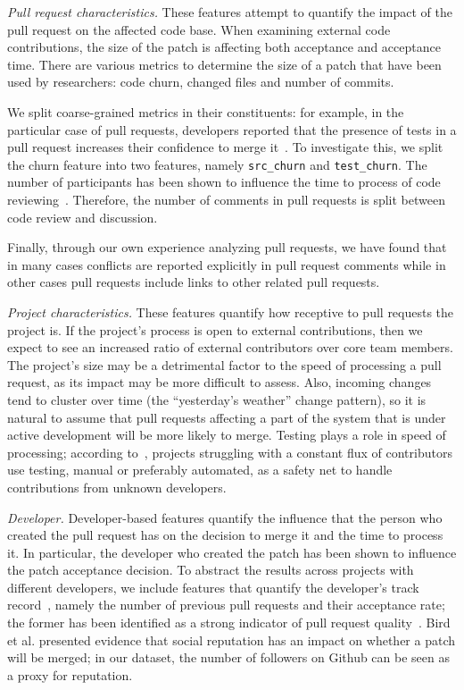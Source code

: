 \documentclass{sig-alternate}
\begin{document}
  \emph{Pull request characteristics.} These features attempt to quantify the
  impact of the pull request on the affected code base. When examining external
  code contributions, the size of the patch is affecting both acceptance and
  acceptance time. There are various metrics to determine the size of a patch
  that have been used by researchers: code churn, changed files and number of
  commits.

  We split coarse-grained metrics in their constituents: for example,
  in the particular case of pull requests, developers reported that
  the presence of tests in a pull request increases their confidence to merge
  it~\cite{Pham13}. To investigate this, we split the churn feature into two
  features, namely \texttt{src\_churn} and \texttt{test\_churn}. The number of
  participants has been shown to influence the time to process of code
  reviewing~\cite{Rigby13}. Therefore, the number of comments in pull requests
  is split between code review and discussion.

  Finally, through our own experience analyzing pull
  requests, we have found that in many cases conflicts are reported explicitly
  in pull request comments while in other cases pull requests include links to
  other related pull requests.

  \emph{Project characteristics.} These features quantify how receptive to pull
  requests the project is. If the project's process is open to external
  contributions, then we expect to see an increased ratio of external
  contributors over core team members. The project's size may be a detrimental
  factor to the speed of processing a pull request, as its impact may be more
  difficult to assess. Also, incoming changes tend to cluster over time (the
  ``yesterday's weather'' change pattern), so it is natural to
  assume that pull requests affecting a part of the system that is under active
  development will be more likely to merge. Testing plays a role in speed of
  processing; according to~\cite{Pham13}, projects struggling with a constant
  flux of contributors use testing, manual or preferably automated, as a safety
  net to handle contributions from unknown developers.

  \emph{Developer.}  Developer-based features quantify the influence that the
  person who created the pull request has on the decision to merge it and the
  time to process it. In particular, the developer who created the patch has
  been shown to influence the patch acceptance decision. To
  abstract the results across projects with different developers, we include
  features that quantify the developer's track record~\cite{Dabbi12}, namely the
  number of previous pull requests and their acceptance rate; the former has
  been identified as a strong indicator of pull request quality~\cite{Pham13}.
  Bird et al. presented evidence that social reputation has an
  impact on whether a patch will be merged; in our dataset, the number of
  followers on Github can be seen as a proxy for reputation.
\end{document}

